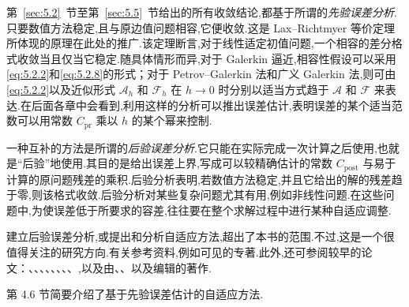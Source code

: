 第~\ref{sec:5.2}~节至第~\ref{sec:5.5}~节给出的所有收敛结论,都基于所谓的\emph{先验误差分析}.只要数值方法稳定,且与原边值问题相容,它便收敛.这是 Lax--Richtmyer 等价定理所体现的原理在此处的推广.该定理断言,对于线性适定初值问题,一个相容的差分格式收敛当且仅当它稳定.随具体情形而异,对于 Galerkin 逼近,相容性假设可以采用\eqref{eq:5.2.2}和\eqref{eq:5.2.8}的形式；对于 Petrov--Galerkin 法和广义 Galerkin 法,则可由\eqref{eq:5.2.2}以及近似形式 \(\mathcal A_h\) 和 \(\mathcal F_h\) 在 \(h\to0\) 时分别以适当方式趋于 \(\mathcal A\) 和 \(\mathcal F\) 来表达.在后面各章中会看到,利用这样的分析可以推出误差估计,表明误差的某个适当范数可以用常数 \(C_{\mathrm{pr}}\) 乘以 \(h\) 的某个幂来控制.

一种互补的方法是所谓的\emph{后验误差分析}.它只能在实际完成一次计算之后使用,也就是“后验”地使用.其目的是给出误差上界,写成可以较精确估计的常数 \(C_{\mathrm{post}}\) 与易于计算的原问题残差的乘积.后验分析表明,若数值方法稳定,并且它给出的解的残差趋于零,则该格式收敛.后验分析对某些复杂问题尤其有用,例如非线性问题.在这些问题中,为使误差低于所要求的容差,往往要在整个求解过程中进行某种自适应调整.

建立后验误差分析,或提出和分析自适应方法,超出了本书的范围.不过,这是一个很值得关注的研究方向.有关参考资料,例如可见的专著.此外,还可参阅较早的论文：、、、、、、、、,以及由、、以及编辑的著作.

第 4.6 节简要介绍了基于先验误差估计的自适应方法.
